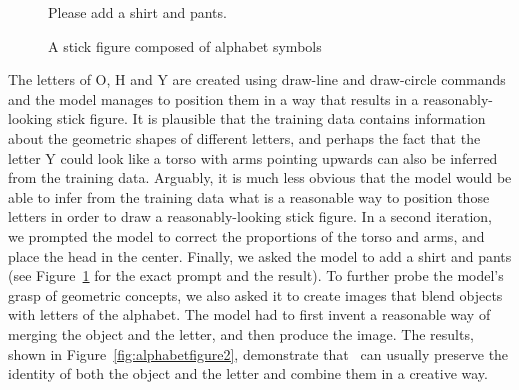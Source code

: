 \begin{figure}[h]
\begin{AIbox}{\DV}
\tcbline
\parbox[t]{0.75\textwidth}{Please add a shirt and pants.}\hspace{50px}

\end{AIbox}
	\caption{A stick figure composed of alphabet symbols}
	\label{fig:alphabetfigure}
\end{figure}

The letters of O, H and Y are created using draw-line and draw-circle commands and the model manages to position them in a way that results in a reasonably-looking stick figure. It is plausible that the training data contains information about the geometric shapes of different letters, and perhaps the fact that the letter Y could look like a torso with arms pointing upwards can also be inferred from the training data. Arguably, it is much less obvious that the model would be able to infer from the training data what is a reasonable way to position those letters in order to draw a reasonably-looking stick figure. In a second iteration, we prompted the model to correct the proportions of the torso and arms, and place the head in the center. Finally, we asked the model to add a shirt and pants (see Figure~\ref{fig:alphabetfigure} for the exact prompt and the result). To further probe the model's grasp of geometric concepts, we also asked it to create images that blend objects with letters of the alphabet. The model had to first invent a reasonable way of merging the object and the letter, and then produce the image. The results, shown in Figure~\ref{fig:alphabetfigure2}, demonstrate that \DV\ can usually preserve the identity of both the object and the letter and combine them in a creative way.

